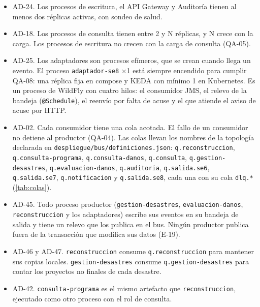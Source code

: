 \documentclass[11pt,letterpaper]{article}
\providecommand{\br}{\discretionary{}{}{}}
\begin{document}
\begin{itemize}
  \item AD-24. Los procesos de escritura, el API Gateway y Auditoría tienen al menos dos réplicas
        activas, con sondeo de salud.
  \item AD-18. Los procesos de consulta tienen entre 2 y N réplicas, y N crece con la carga. Los
        procesos de escritura no crecen con la carga de consulta (QA-05).
  \item AD-25. Los adaptadores son procesos efímeros, que se crean cuando llega un evento. El
        proceso \texttt{adaptador-se8} ×1 está siempre encendido para cumplir QA-08: una réplica fija
        en compose y KEDA con mínimo 1 en Kubernetes. Es un proceso de WildFly con cuatro hilos:
        el consumidor JMS, el relevo de la bandeja (\texttt{@Schedule}), el reenvío por falta de
        acuse y el que atiende el aviso de acuse por HTTP.
  \item AD-02. Cada consumidor tiene una cola acotada. El fallo de un consumidor no detiene al
        productor (QA-04). Las colas llevan los nombres de la topología declarada en
        \texttt{despliegue/\br{}bus/\br{}definiciones.\br{}json}: \texttt{q.\br{}reconstruccion},
        \texttt{q.\br{}consulta-\br{}programa}, \texttt{q.\br{}consulta-\br{}danos}, \texttt{q.consulta},
        \texttt{q.\br{}gestion-\br{}desastres}, \texttt{q.\br{}evaluacion-\br{}danos}, \texttt{q.auditoria},
        \texttt{q.salida.se6}, \texttt{q.salida.se7}, \texttt{q.\br{}notificacion} y
        \texttt{q.salida.se8}, cada una con su cola \texttt{dlq.*} (\cref{tab:colas}).
  \item AD-45. Todo proceso productor (\texttt{gestion-\br{}desastres}, \texttt{evaluacion-\br{}danos},
        \texttt{reconstruccion} y los adaptadores) escribe sus eventos en su bandeja de salida y
        tiene un relevo que los publica en el bus. Ningún productor publica fuera de la transacción
        que modifica sus datos (E-19).
  \item AD-46 y AD-47. \texttt{reconstruccion} consume \texttt{q.\br{}reconstruccion} para mantener sus
        copias locales. \texttt{gestion-\br{}desastres} consume \texttt{q.\br{}gestion-\br{}desastres} para contar
        los proyectos no finales de cada desastre.
  \item AD-42. \texttt{consulta-\br{}programa} es el mismo artefacto que \texttt{reconstruccion},
        ejecutado como otro proceso con el rol de consulta.
\end{itemize}
\end{document}

